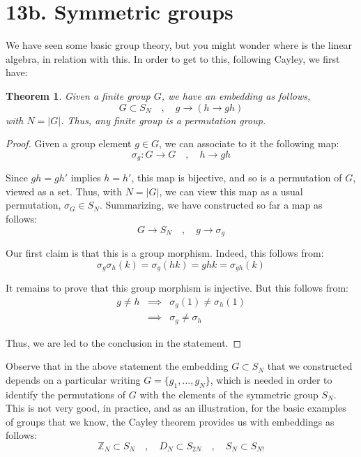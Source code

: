 \documentclass[12pt]{amsbook}
\newtheorem{theorem}{Theorem}[chapter]
\begin{document}
\section*{13b. Symmetric groups}

We have seen some basic group theory, but you might wonder where is the linear algebra, in relation with this. In order to get to this, following Cayley, we first have:


\begin{theorem}
Given a finite group $G$, we have an embedding as follows,
$$G\subset S_N\quad,\quad g\to(h\to gh)$$
with $N=|G|$. Thus, any finite group is a permutation group. 
\end{theorem}

\begin{proof}
Given a group element $g\in G$, we can associate to it the following map:
$$\sigma_g:G\to G\quad,\quad 
h\to gh$$

Since $gh=gh'$ implies $h=h'$, this map is bijective, and so is a permutation of $G$, viewed as a set. Thus, with $N=|G|$, we can view this map as a usual permutation, $\sigma_G\in S_N$. Summarizing, we have constructed so far a map as follows:
$$G\to S_N\quad,\quad 
g\to\sigma_g$$

Our first claim is that this is a group morphism. Indeed, this follows from:
$$\sigma_g\sigma_h(k)
=\sigma_g(hk)
=ghk
=\sigma_{gh}(k)$$

It remains to prove that this group morphism is injective. But this follows from:
\begin{eqnarray*}
g\neq h
&\implies&\sigma_g(1)\neq\sigma_h(1)\\
&\implies&\sigma_g\neq\sigma_h
\end{eqnarray*}

Thus, we are led to the conclusion in the statement.
\end{proof}

Observe that in the above statement the embedding $G\subset S_N$ that we constructed depends on a particular writing $G=\{g_1,\ldots,g_N\}$, which is needed in order to identify the permutations of $G$ with the elements of the symmetric group $S_N$. This is not very good, in practice, and as an illustration, for the basic examples of groups that we know, the Cayley theorem provides us with embeddings as follows:
$$\mathbb Z_N\subset S_N\quad,\quad 
D_N\subset S_{2N}\quad,\quad 
S_N\subset S_{N!}$$
\end{document}

